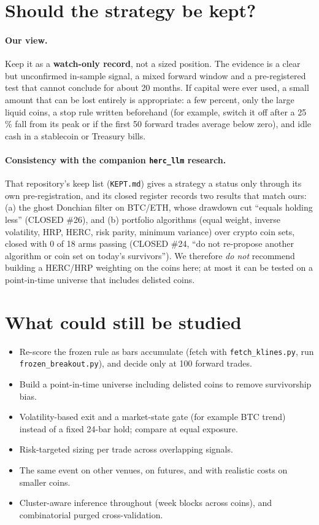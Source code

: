 \documentclass[11pt,a4paper]{article}
\newcommand{\code}[1]{\texttt{#1}}
\begin{document}
\section{Should the strategy be kept?}
\paragraph{Our view.} Keep it as a \textbf{watch-only record}, not a sized position. The evidence is a clear but unconfirmed in-sample signal, a mixed forward window and a pre-registered test that cannot conclude for about 20 months.
If capital were ever used, a small amount that can be lost entirely is appropriate: a few percent, only the large liquid coins, a stop rule written beforehand (for example, switch it off after a 25\,\% fall from its peak or if the first 50 forward trades average below zero), and idle cash in a stablecoin or Treasury bills.
\paragraph{Consistency with the companion \texttt{herc\_llm} research.} That repository's keep list (\code{KEPT.md}) gives a strategy a status only through its own pre-registration, and its closed register records two results that match ours: (a) the ghost Donchian filter on BTC/ETH,
whose drawdown cut ``equals holding less'' (CLOSED \#26), and (b) portfolio algorithms (equal weight, inverse volatility, HRP, HERC, risk parity, minimum variance) over crypto coin sets, closed with 0 of 18 arms passing (CLOSED \#24, ``do not re-propose another algorithm or coin set on today's survivors'').
We therefore \emph{do not} recommend building a HERC/HRP weighting on the coins here; at most it can be tested on a point-in-time universe that includes delisted coins.

\section{What could still be studied}
\begin{itemize}
\item Re-score the frozen rule as bars accumulate (fetch with \code{fetch\_klines.py}, run \code{frozen\_breakout.py}), and decide only at 100 forward trades.
\item Build a point-in-time universe including delisted coins to remove survivorship bias.
\item Volatility-based exit and a market-state gate (for example BTC trend) instead of a fixed 24-bar hold; compare at equal exposure.
\item Risk-targeted sizing per trade across overlapping signals.
\item The same event on other venues, on futures, and with realistic costs on smaller coins.
\item Cluster-aware inference throughout (week blocks across coins), and combinatorial purged cross-validation.
\end{itemize}
\end{document}
